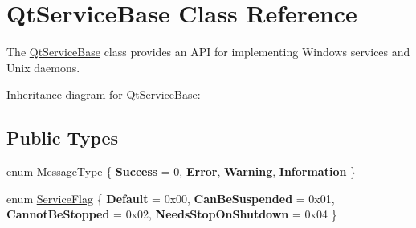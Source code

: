 \hypertarget{class_qt_service_base}{}\section{Qt\+Service\+Base Class Reference}
\label{class_qt_service_base}


The \mbox{\hyperlink{class_qt_service_base}{Qt\+Service\+Base}} class provides an A\+PI for implementing Windows services and Unix daemons.  




Inheritance diagram for Qt\+Service\+Base\+:
\subsection*{Public Types}
\begin{DoxyCompactItemize}
\item 
enum \mbox{\hyperlink{class_qt_service_base_acffd9389fe7178bf1f35d8bf3dae1095}{Message\+Type}} \{ {\bfseries Success} = 0, 
{\bfseries Error}, 
{\bfseries Warning}, 
{\bfseries Information}
 \}
\item 
enum \mbox{\hyperlink{class_qt_service_base_af6e74a87329ef64760783364538e5d51}{Service\+Flag}} \{ {\bfseries Default} = 0x00, 
{\bfseries Can\+Be\+Suspended} = 0x01, 
{\bfseries Cannot\+Be\+Stopped} = 0x02, 
{\bfseries Needs\+Stop\+On\+Shutdown} = 0x04
 \}
\end{DoxyCompactItemize}
